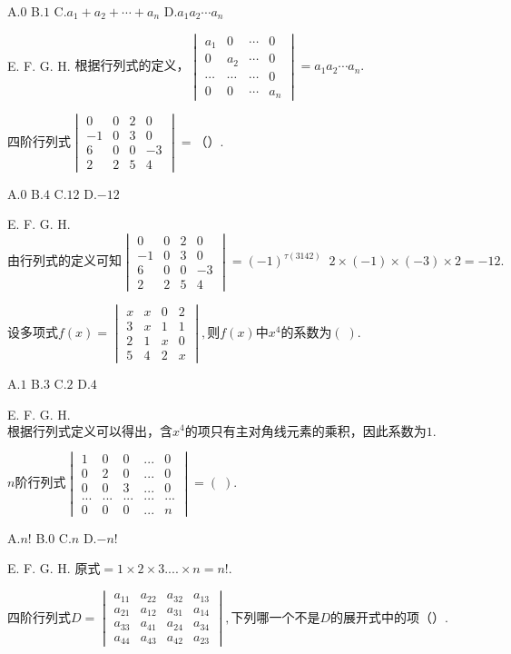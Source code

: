 A.$0$   B.$1$   C.$a_1+a_2+\cdots+a_n$   D.$a_1a_2\cdots a_n$

E.   F.   G.   H.
$\mathrm{根据行列式的定义}，\begin{vmatrix}a_1&0&\cdots&0\\0&a_2&\cdots&0\\\cdots&\cdots&\cdots&0\\0&0&\cdots&a_n\end{vmatrix}=a_1a_2\cdots a_n.$


$\mathrm{四阶行列式}\begin{vmatrix}0&0&2&0\\-1&0&3&0\\6&0&0&-3\\2&2&5&4\end{vmatrix}=（）.$

A.$0$   B.$4$   C.$12$   D.$-12$

E.   F.   G.   H.
$\mathrm{由行列式的定义可知}\begin{vmatrix}0&0&2&0\\-1&0&3&0\\6&0&0&-3\\2&2&5&4\end{vmatrix}=(-1)^{\tau(3142)}\;\;2\times(-1)\times(-3)\times2=-12.$


$\mathrm{设多项式}f(x)=\begin{vmatrix}x&x&0&2\\3&x&1&1\\2&1&x&0\\5&4&2&x\end{vmatrix},则f(x)中x^4\mathrm{的系数为}(\;).$

A.$1$   B.$3$   C.$2$   D.$4$

E.   F.   G.   H.
$\mathrm{根据行列式定义可以得出}，含x^4\mathrm{的项只有主对角线元素的乘积}，\mathrm{因此系数为}1.$


$n\mathrm{阶行列式}\begin{vmatrix}1&0&0&...&0\\0&2&0&...&0\\0&0&3&...&0\\...&...&...&...&...\\0&0&0&...&n\end{vmatrix}=(\;).$

A.$n!$   B.$0$   C.$n$   D.$-n!$

E.   F.   G.   H.
$\mathrm{原式}=1\times2\times3....\times n=n!.$


$\mathrm{四阶行列式}D=\begin{vmatrix}a_{11}&a_{22}&a_{32}&a_{13}\\a_{21}&a_{12}&a_{31}&a_{14}\\a_{33}&a_{41}&a_{24}&a_{34}\\a_{44}&a_{43}&a_{42}&a_{23}\end{vmatrix},\mathrm{下列哪一个不是}D\mathrm{的展开式中的项}（）.$

